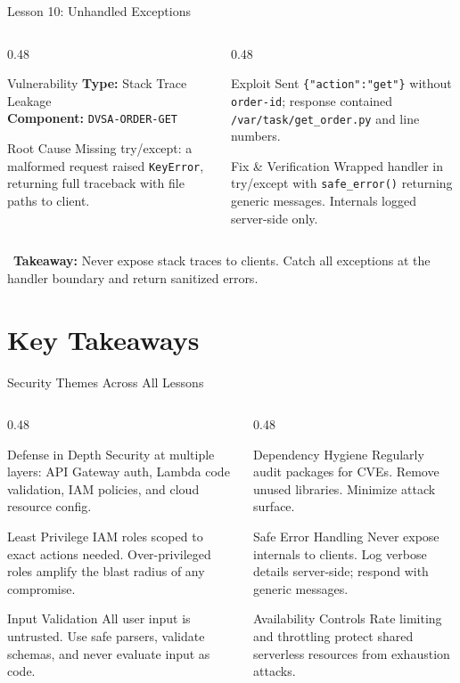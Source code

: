 \documentclass[aspectratio=169,10pt]{beamer}
\newcommand{\lessonslide}[8]{
\begin{frame}{Lesson #1: #2}
\begin{columns}[T]
\begin{column}{0.48\textwidth}
  \begin{alertblock}{\ding{72} Vulnerability}
    \textbf{Type:} #3\\
    \textbf{Component:} \texttt{#4}
  \end{alertblock}
  \begin{block}{\ding{46} Root Cause}
    #5
  \end{block}
\end{column}
\begin{column}{0.48\textwidth}
  \begin{alertblock}{\ding{55} Exploit}
    #6
  \end{alertblock}
  \begin{exampleblock}{\ding{51} Fix \& Verification}
    #7
  \end{exampleblock}
\end{column}
\end{columns}
\vspace{0.3em}
\centering\small\textcolor{kfupm}{\ding{228}~\textbf{Takeaway:} #8}
\end{frame}
}
\begin{document}
\lessonslide{10}{Unhandled Exceptions}
{Stack Trace Leakage}
{DVSA-ORDER-GET}
{Missing try/except: a malformed request raised \texttt{KeyError}, returning full traceback with file paths to client.}
{Sent \texttt{\{"action":"get"\}} without \texttt{order-id}; response contained \texttt{/var/task/get\_order.py} and line numbers.}
{Wrapped handler in try/except with \texttt{safe\_error()} returning generic messages. Internals logged server-side only.}
{Never expose stack traces to clients. Catch all exceptions at the handler boundary and return sanitized errors.}

\section{Key Takeaways}

\begin{frame}{Security Themes Across All Lessons}
\begin{columns}[T]
\begin{column}{0.48\textwidth}
  \begin{block}{ Defense in Depth}
    Security at multiple layers: API Gateway auth, Lambda code validation, IAM policies, and cloud resource config.
  \end{block}
  \vspace{0.3em}
  \begin{block}{ Least Privilege}
    IAM roles scoped to exact actions needed. Over-privileged roles amplify the blast radius of any compromise.
  \end{block}
  \vspace{0.3em}
  \begin{block}{ Input Validation}
    All user input is untrusted. Use safe parsers, validate schemas, and never evaluate input as code.
  \end{block}
\end{column}
\begin{column}{0.48\textwidth}
  \begin{block}{ Dependency Hygiene}
    Regularly audit packages for CVEs. Remove unused libraries. Minimize attack surface.
  \end{block}
  \vspace{0.3em}
  \begin{block}{ Safe Error Handling}
    Never expose internals to clients. Log verbose details server-side; respond with generic messages.
  \end{block}
  \vspace{0.3em}
  \begin{block}{ Availability Controls}
    Rate limiting and throttling protect shared serverless resources from exhaustion attacks.
  \end{block}
\end{column}
\end{columns}
\end{frame}
\end{document}
